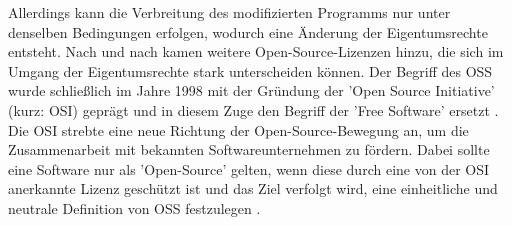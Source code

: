 Allerdings kann die Verbreitung des modifizierten Programms nur unter denselben Bedingungen erfolgen, wodurch eine Änderung der Eigentumsrechte entsteht. Nach und nach kamen weitere Open-Source-Lizenzen hinzu, die sich im Umgang der Eigentumsrechte stark unterscheiden können. Der Begriff des OSS wurde schließlich im Jahre 1998 mit der Gründung der 'Open Source Initiative' (kurz: OSI) \cite{open_source_inititative_open_2018} geprägt und in diesem Zuge den Begriff der 'Free Software' ersetzt \cite{raymond_cathedral_2001}. Die OSI strebte eine neue Richtung der Open-Source-Bewegung an, um die Zusammenarbeit mit bekannten Softwareunternehmen zu fördern. Dabei sollte eine Software nur als 'Open-Source' gelten, wenn diese durch eine von der OSI anerkannte Lizenz geschützt ist und das Ziel verfolgt wird, eine einheitliche und neutrale Definition von OSS festzulegen \cite[S. 262]{buxmann_softwareindustrie_2015}.






